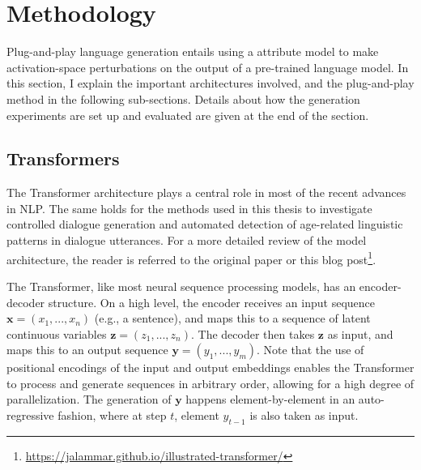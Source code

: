 \section{Methodology}
\label{sec:exp2_methods}

Plug-and-play language generation entails using a attribute model to make activation-space perturbations on the output of a pre-trained language model. In this section, I explain the important architectures involved, and the plug-and-play method in the following sub-sections. Details about how the generation experiments are set up and evaluated are given at the end of the section.


\subsection{Transformers}

The Transformer architecture plays a central role in most of the recent advances in NLP. The same holds for the methods used in this thesis to investigate controlled dialogue generation and automated detection of age-related linguistic patterns in dialogue utterances. For a more detailed review of the model architecture, the reader is referred to the original paper \citep{vaswani2017attention} or this blog post\footnote{\url{https://jalammar.github.io/illustrated-transformer/}}.

The Transformer, like most neural sequence processing models, has an encoder-decoder structure. On a high level, the encoder receives an input sequence $\textbf{x} = (x_1, ..., x_n)$ (e.g., a sentence), and maps this to a sequence of latent continuous variables $\textbf{z} = (z_1, ..., z_n)$. The decoder then takes $\textbf{z}$ as input, and maps this to an output sequence $\textbf{y} = (y_1, ..., y_m)$. Note that the use of positional encodings of the input and output embeddings enables the Transformer to process and generate sequences in arbitrary order, allowing for a high degree of parallelization. The generation of $\textbf{y}$ happens element-by-element in an auto-regressive fashion, where at step $t$, element $y_{t - 1}$ is also taken as input.

